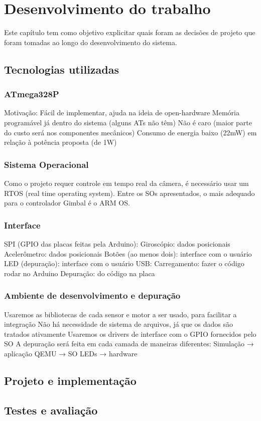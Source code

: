 \chapter{Desenvolvimento do trabalho}

Este capítulo tem como objetivo explicitar quais foram as decisões de projeto que foram tomadas ao longo do desenvolvimento do sistema.

\section{Tecnologias utilizadas}


\subsection{ATmega328P}
Motivação:
Fácil de implementar, ajuda na ideia de open-hardware
Memória programável já dentro do sistema (alguns ATs não têm)
Não é caro (maior parte do custo será nos componentes mecânicos)
Consumo de energia baixo (22mW) em relação à potência proposta (de 1W)

\subsection{Sistema Operacional}
Como o projeto requer controle em tempo real da câmera, é necessário usar um RTOS (real time operating system).
Entre os SOs apresentados, o mais adequado para o controlador Gimbal é o ARM OS.

\subsection{Interface}
SPI (GPIO das placas feitas pela Arduino):
Giroscópio: dados posicionais
Acelerômetro: dados posicionais
Botões (ao menos dois): interface com o usuário
LED (depuração): interface com o usuário
USB:
Carregamento: fazer o código rodar no Arduino 
Depuração: do código na placa

\subsection{Ambiente de desenvolvimento e depuração}
Usaremos as bibliotecas de cada sensor e motor a ser usado, para facilitar a integração
Não há necessidade de sistema de arquivos, já que os dados são tratados ativamente
Usaremos os drivers de interface com o GPIO fornecidos pelo SO
A depuração será feita em cada camada de maneiras diferentes: 
Simulação → aplicação 
QEMU → SO 
LEDs → hardware 

\section{Projeto e implementação}

\section{Testes e avaliação}



